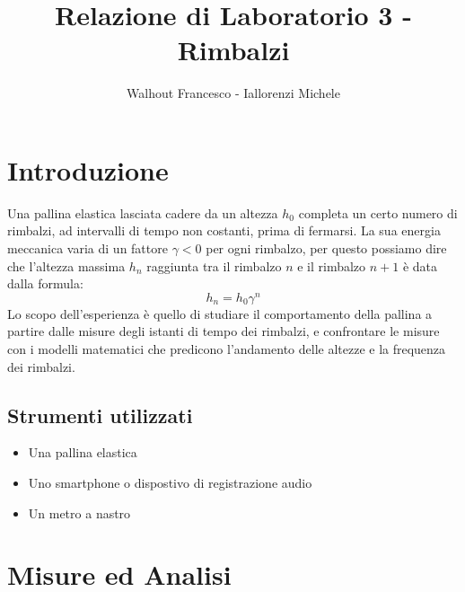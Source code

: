 \documentclass[a4paper]{article}
\title{Relazione di Laboratorio 3 - Rimbalzi}
\author{Walhout Francesco - Iallorenzi Michele}
\begin{document}
    \maketitle

    \section{Introduzione}
    Una pallina elastica lasciata cadere da un altezza $h_0$ completa un certo numero di 
    rimbalzi, ad intervalli di tempo non costanti, prima di fermarsi.
    La sua energia meccanica varia di un fattore $ \gamma<0$ per ogni rimbalzo,
    per questo possiamo dire che l'altezza massima  $h_n$ raggiunta tra il rimbalzo
    $n$ e il rimbalzo $n+1$ è  data dalla formula:
    \begin{equation}
        \label{eq:altezza 1}
        h_n=h_0 \gamma^{n}
    \end{equation}
    Lo scopo dell'esperienza è quello di studiare il comportamento della pallina a partire
    dalle misure degli istanti di tempo dei rimbalzi, e confrontare le misure con i modelli
    matematici che predicono l'andamento delle altezze e la frequenza dei rimbalzi.

    \subsection{Strumenti utilizzati}
    \begin{itemize}
        \item Una pallina elastica
        \item Uno smartphone o dispostivo di registrazione audio
        \item Un metro a nastro
    \end{itemize}

    \section{Misure ed Analisi}
\end{document}
